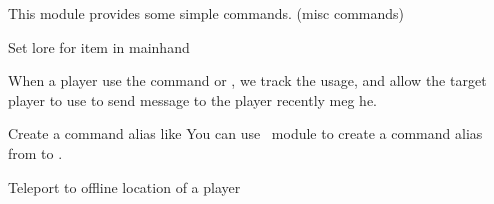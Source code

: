 
This module provides some simple commands.
(misc commands)











\begin{example}{Set lore for item in mainhand}
\end{example}







When a player use the command  or , we track the usage, and allow the target player to use  to send message to the player recently meg he.

\begin{tips}{Create a command alias like }
    You can use~ module to create a command alias from  to .
\end{tips}








\begin{example}{Teleport to offline location of a player}
\end{example}

